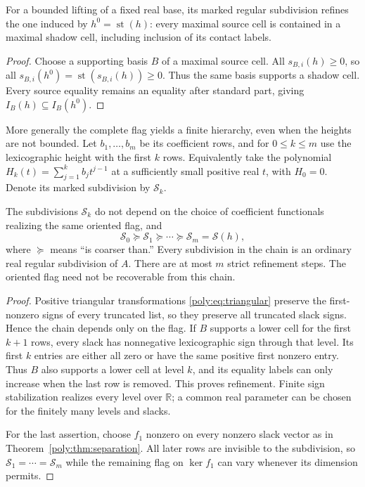 \documentclass[11pt,a4paper]{article}
\numberwithin{equation}{section}
\theoremstyle{plain}
\newcommand{\R}{\mathbb R}
\newcommand{\st}{\operatorname{st}}
\newcommand{\cS}{\mathcal S}
\begin{document}
\begin{proposition}
\label{poly:prop:refineshadow}
For a bounded lifting of a fixed real base, its marked regular subdivision
refines the one induced by $h^0=\st(h)$: every maximal source cell is
contained in a maximal shadow cell, including inclusion of its contact
labels.
\end{proposition}
\begin{proof}
Choose a supporting basis $B$ of a maximal source cell. All
$s_{B,i}(h)\ge0$, so all
$s_{B,i}(h^0)=\st(s_{B,i}(h))\ge0$. Thus the same basis supports a
shadow cell. Every source equality remains an equality after standard
part, giving $I_B(h)\subseteq I_B(h^0)$.
\end{proof}

More generally the complete flag yields a finite hierarchy, even when the
heights are not bounded. Let $b_1,\ldots,b_m$ be its coefficient rows,
and for $0\le k\le m$ use the lexicographic height with the first $k$
rows. Equivalently take the polynomial
$H_k(t)=\sum_{j=1}^k b_jt^{j-1}$ at a sufficiently small positive real
$t$, with $H_0=0$. Denote its marked subdivision by $\cS_k$.

\begin{proposition}\label{poly:prop:chain}
The subdivisions $\cS_k$ do not depend on the choice of coefficient
functionals realizing the same oriented flag, and
\[
 \cS_0\succeq\cS_1\succeq\cdots\succeq\cS_m=\cS(h),
\]
where $\succeq$ means ``is coarser than.'' Every subdivision in the chain
is an ordinary real regular subdivision of $A$. There are at most $m$
strict refinement steps. The oriented flag need not be recoverable from
this chain.
\end{proposition}
\begin{proof}
Positive triangular transformations \eqref{poly:eq:triangular} preserve the
first-nonzero signs of every truncated list, so they preserve all truncated
slack signs. Hence the chain depends only on the flag.
If $B$ supports a lower cell for the first $k+1$ rows, every slack has
nonnegative lexicographic sign through that level. Its first $k$ entries
are either all zero or have the same positive first nonzero entry. Thus
$B$ also supports a lower cell at level $k$, and its equality labels can
only increase when the last row is removed. This proves refinement.
Finite sign stabilization realizes every level over $\R$; a common real
parameter can be chosen for the finitely many levels and slacks.

For the last assertion, choose $f_1$ nonzero on every nonzero slack vector
as in Theorem~\ref{poly:thm:separation}. All later rows are invisible to the
subdivision, so $\cS_1=\cdots=\cS_m$ while the remaining flag on
$\ker f_1$ can vary whenever its dimension permits.
\end{proof}
\end{document}
